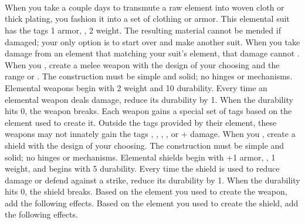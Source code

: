 \documentclass[darkmode]{dw_playbook}
\begin{document}
    {
        ~
    }

\clearpage
~

\pageThree
    {
        \begin{minipage}[t]{\textwidth}
            \\
        \end{minipage}
    }
    {
            {When you take a couple days to transmute a raw element into woven cloth or thick plating, you fashion it into a set of clothing or armor.  This elemental suit has the tags 1 armor, , 2 weight.  The resulting material cannot be mended if damaged; your only option is to start over and make another suit.
            \gap
            When you take damage from an element that matching your suit’s element, that damage cannot .}
        \gap
            {When you , create a melee weapon with the design of your choosing and the range  or .
            \gap
            The construction must be simple and solid; no hinges or mechanisms.  Elemental weapons begin with 2 weight and 10 durability.  Every time an elemental weapon deals damage, reduce its durability by 1.  When the durability hits 0, the weapon breaks.
            \gap
            Each weapon gains a special set of tags based on the element used to create it.  Outside the tags provided by their element, these weapons may not innately gain the tags , , , , or + damage.
            \gapSm
            \gapSm
            \gapSm
            }
            {When you , create a shield with the design of your choosing.  The construction must be simple and solid; no hinges or mechanisms.  Elemental shields begin with +1 armor, , 1 weight, and begins with 5 durability.
            \gap
            Every time the shield is used to reduce damage or defend against a strike, reduce its durability by 1.  When the durability hits 0, the shield breaks.  Based on the element you used to create the weapon, add the following effects.
            \gap
            Based on the element you used to create the shield, add the following effects.
            \gapSm
            \gapSm
            \gapSm
            }
    }
    {
        ~
    }
\end{document}
